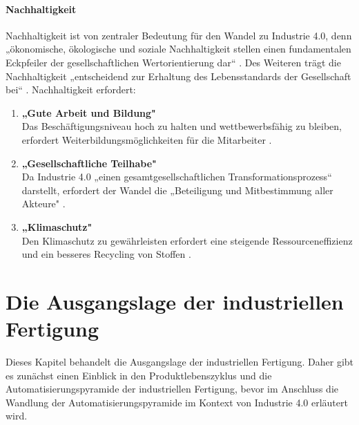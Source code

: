 \paragraph{Nachhaltigkeit}\label{sec:Nachhaltigkeit}
\noindent Nachhaltigkeit ist von zentraler Bedeutung für den Wandel zu Industrie 4.0, denn „ökonomische, ökologische und soziale Nachhaltigkeit stellen einen fundamentalen Eckpfeiler der gesellschaftlichen Wertorientierung dar“ \cite[S.6]{3}. Des Weiteren trägt die Nachhaltigkeit „entscheidend zur Erhaltung des Lebensstandards der Gesellschaft bei“ \cite[S.6]{3}.
Nachhaltigkeit erfordert:
\begin{enumerate}
	\item \textbf{„Gute Arbeit und Bildung"} \cite[S.6]{3} \\
	Das Beschäftigungsniveau hoch zu halten und wettbewerbsfähig zu bleiben, erfordert
	Weiterbildungsmöglichkeiten für die Mitarbeiter \cite[S.6]{3}.
	\item \textbf{„Gesellschaftliche Teilhabe"} \cite[S.6]{3} \\
	Da Industrie 4.0 „einen gesamtgesellschaftlichen Transformationsprozess“ \cite[S.6]{3} darstellt, erfordert der Wandel die „Beteiligung und Mitbestimmung aller Akteure" \cite[S.6]{3}.
	\item \textbf{„Klimaschutz"} \cite[S.6]{3} \\
	Den Klimaschutz zu gewährleisten erfordert eine steigende Ressourceneffizienz
	und ein besseres Recycling von Stoffen \cite[S.6]{3}.
\end{enumerate}
\section{Die Ausgangslage der industriellen Fertigung}\label{sec:IndustrielleFertigung}
Dieses Kapitel behandelt die Ausgangslage der industriellen Fertigung. Daher gibt es zunächst einen Einblick in den Produktlebenszyklus und die Automatisierungspyramide der industriellen Fertigung, bevor im Anschluss die Wandlung der Automatisierungspyramide im Kontext von Industrie 4.0 erläutert wird.

